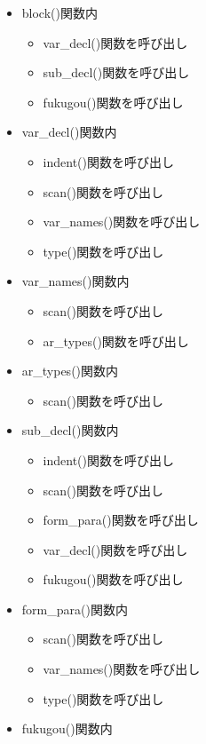 \documentclass{jarticle}
\begin{document}
\begin{itemize}
\begin{itemize}
\begin{itemize}
    \end{itemize}
    \item block()関数内
    \begin{itemize}
      \item var\_decl()関数を呼び出し
      \item sub\_decl()関数を呼び出し
      \item fukugou()関数を呼び出し
    \end{itemize}
    \item var\_decl()関数内
    \begin{itemize}
      \item indent()関数を呼び出し
      \item scan()関数を呼び出し
      \item var\_names()関数を呼び出し
      \item type()関数を呼び出し
    \end{itemize}
    \item var\_names()関数内
    \begin{itemize}
      \item scan()関数を呼び出し
      \item ar\_types()関数を呼び出し
    \end{itemize}
    \item ar\_types()関数内
    \begin{itemize}
      \item scan()関数を呼び出し
    \end{itemize}
    \item sub\_decl()関数内
    \begin{itemize}
      \item indent()関数を呼び出し
      \item scan()関数を呼び出し
      \item form\_para()関数を呼び出し
      \item var\_decl()関数を呼び出し
      \item fukugou()関数を呼び出し
    \end{itemize}
    \item form\_para()関数内
    \begin{itemize}
      \item scan()関数を呼び出し
      \item var\_names()関数を呼び出し
      \item type()関数を呼び出し
    \end{itemize}
    \item fukugou()関数内

\end{itemize}
\end{itemize}
\end{document}
